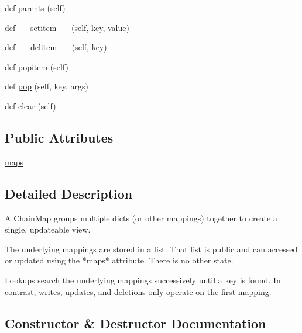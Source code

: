 \begin{DoxyCompactItemize}
\item 
def \hyperlink{classpip_1_1__vendor_1_1distlib_1_1compat_1_1ChainMap_ac1302176ca853a2887a933eb8f4dfccf}{parents} (self)
\item 
def \hyperlink{classpip_1_1__vendor_1_1distlib_1_1compat_1_1ChainMap_a9dda76e67f06f60cd32e6ffec1d2a6fa}{\+\_\+\+\_\+setitem\+\_\+\+\_\+} (self, key, value)
\item 
def \hyperlink{classpip_1_1__vendor_1_1distlib_1_1compat_1_1ChainMap_a456ea4a754c9c2348e269f681168054d}{\+\_\+\+\_\+delitem\+\_\+\+\_\+} (self, key)
\item 
def \hyperlink{classpip_1_1__vendor_1_1distlib_1_1compat_1_1ChainMap_ad989adbb578291ae27b5319ec5f7870f}{popitem} (self)
\item 
def \hyperlink{classpip_1_1__vendor_1_1distlib_1_1compat_1_1ChainMap_af3c10c40be99af3f144a53affbe022b5}{pop} (self, key, args)
\item 
def \hyperlink{classpip_1_1__vendor_1_1distlib_1_1compat_1_1ChainMap_a45d5bf8cf2c6a7c73c4aafb9424413f8}{clear} (self)
\end{DoxyCompactItemize}
\subsection*{Public Attributes}
\begin{DoxyCompactItemize}
\item 
\hyperlink{classpip_1_1__vendor_1_1distlib_1_1compat_1_1ChainMap_a00c70d531abd661a7593f8b48e09a2e9}{maps}
\end{DoxyCompactItemize}


\subsection{Detailed Description}
\begin{DoxyVerb}A ChainMap groups multiple dicts (or other mappings) together
to create a single, updateable view.

The underlying mappings are stored in a list.  That list is public and can
accessed or updated using the *maps* attribute.  There is no other state.

Lookups search the underlying mappings successively until a key is found.
In contrast, writes, updates, and deletions only operate on the first
mapping.\end{DoxyVerb}
 

\subsection{Constructor \& Destructor Documentation}
\mbox{\label{classpip_1_1__vendor_1_1distlib_1_1compat_1_1ChainMap_a9b6137150ce55b7ce69b969f60d97b83}} 
